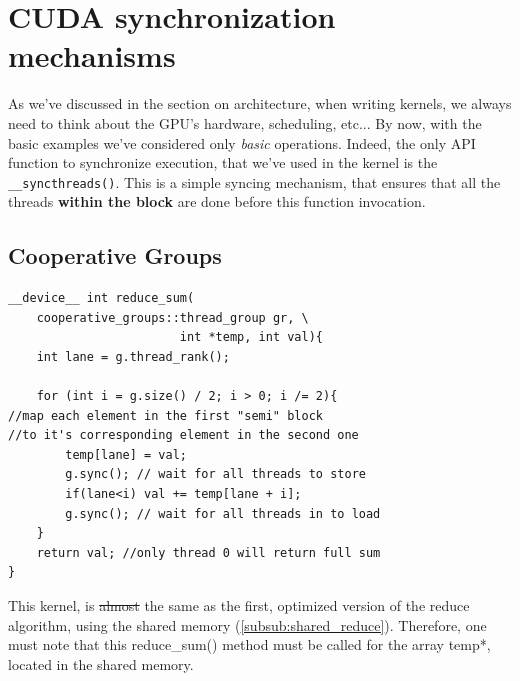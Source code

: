 \section{CUDA synchronization mechanisms}

As we've discussed in the section on architecture, when writing kernels, we always need to think about the GPU's hardware, scheduling, etc...
By now, with the basic examples we've considered only \textit{basic} operations. Indeed, the only API function to synchronize execution, that we've used in the kernel is the \verb|__syncthreads()|. 
This is a simple syncing mechanism, that ensures that all the threads \textbf{within the block} are 
done before this function invocation. 

\subsection{Cooperative Groups}

\begin{listing}
\begin{verbatim}
__device__ int reduce_sum(
    cooperative_groups::thread_group gr, \
                        int *temp, int val){
    int lane = g.thread_rank();

    for (int i = g.size() / 2; i > 0; i /= 2){ 
//map each element in the first "semi" block 
//to it's corresponding element in the second one
        temp[lane] = val;
        g.sync(); // wait for all threads to store
        if(lane<i) val += temp[lane + i];
        g.sync(); // wait for all threads in to load
    }
    return val; //only thread 0 will return full sum
}
\end{verbatim}
    \caption{This kernel, is \sout{almost} the same as the first, optimized version of the reduce 
    algorithm, using the shared memory (\autoref{subsub:shared_reduce}). Therefore, one must note that this reduce\_sum() method 
    must be called for the array temp*, located in the shared memory.}
\label{listing:coop_group}
\end{listing}


